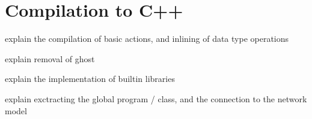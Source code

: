 \section{Compilation to C++}

explain the compilation of basic actions, and inlining of data type operations

explain removal of ghost

explain the implementation of builtin libraries

explain exctracting the global program / class, and the connection to
the network model
